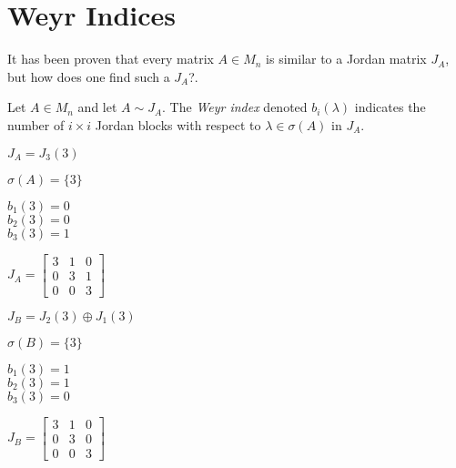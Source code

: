 \documentclass[letterpaper,12pt,fleqn]{article}
\renewcommand{\l}{\lambda}
\renewcommand{\o}{\sigma}
\begin{document}
\section*{Weyr Indices}

It has been proven that every matrix $A\in M_n$ is similar to a Jordan matrix
$J_A$, but how does one find such a $J_A$?.

\begin{definition}
  Let $A\in M_n$ and let $A\sim J_A$. The \emph{Weyr index} denoted $b_i(\l)$
  indicates the number of $i\times i$ Jordan blocks with respect to
  $\l\in\o(A)$ in $J_A$.
\end{definition}

\begin{example}
  \begin{minipage}{3in}
    $J_A=J_3(3)$

    \bigskip

    $\o(A)=\{3\}$

    \bigskip

    $b_1(3)=0$ \\
    $b_2(3)=0$ \\
    $b_3(3)=1$ \\

    \bigskip

    $J_A=\begin{bmatrix}
    3 & 1 & 0 \\
    0 & 3 & 1 \\
    0 & 0 & 3
    \end{bmatrix}$
  \end{minipage}
  \begin{minipage}{3in}
    $J_B=J_2(3)\oplus J_1(3)$

    \bigskip

    $\o(B)=\{3\}$

    \bigskip

    $b_1(3)=1$ \\
    $b_2(3)=1$ \\
    $b_3(3)=0$ \\

    \bigskip

    $J_B=\left[\begin{array}{cc|c}
    3 & 1 & 0 \\
    0 & 3 & 0 \\
    \hline
    0 & 0 & 3
    \end{array}\right]$
  \end{minipage}
\end{example}
\end{document}
